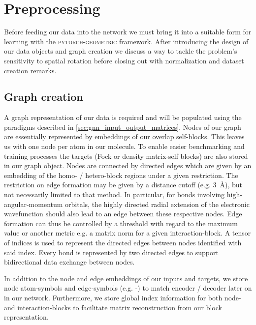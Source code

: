 \section{Preprocessing}
\label{sec:gnn_preproc}
Before feeding our data into the network we must bring it into a suitable form for learning with the \textsc{pytorch-geometric} framework. \parencite{ref:PyTorchGeometric, ref:PyTorch_geom_paper} After introducing the design of our data objects and graph creation we discuss a way to tackle the problem's sensitivity to spatial rotation before closing out with normalization and dataset creation remarks. 
\subsection{Graph creation}
\label{subsec:gnn_graph_creation}
A graph representation of our data is required and will be populated using the paradigms described in \autoref{sec:gnn_input_output_matrices}. Nodes of our graph are essentially represented by embeddings of our overlap self-blocks. This leaves us with one node per atom in our molecule. To enable easier benchmarking and training processes the targets (Fock or density matrix-self blocks) are also stored in our graph object. Nodes are connected by directed edges which are given by an embedding of the homo- / hetero-block regions under a given restriction. The restriction on edge formation may be given by a distance cutoff (e.g. \SI{3}{\angstrom}), but not necessarily limited to that method. In particular, for bonds involving high-angular-momentum orbitals, the highly directed radial extension of the electronic wavefunction should also lead to an edge between these respective nodes. Edge formation can thus be controlled by a threshold with regard to the maximum value or another metric e.g. a matrix norm for a given interaction-block. A tensor of indices is used to represent the directed edges between nodes identified with said index. Every bond is represented by two directed edges to support bidirectional data exchange between nodes.

In addition to the node and edge embeddings of our inputs and targets, we store node atom-symbols and edge-symbols (e.g. -) to match encoder / decoder later on in our network. Furthermore, we store global index information for both node- and interaction-blocks to facilitate matrix reconstruction from our block representation. 

